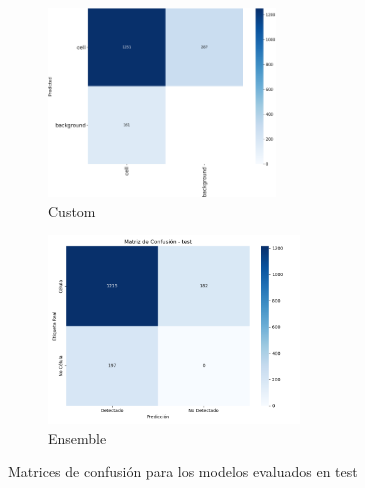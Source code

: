 \documentclass[12pt,a4paper,onecolumn,oneside]{report}
\begin{document}
\begin{figure}[H]
  \vspace{0.1cm}
  \begin{subfigure}[b]{0.45\textwidth}
    \centering
    \includegraphics[height=5cm]{figuras/resultados experimentacion/custom/test/confusion_matrix.png}
    \vspace{-0.3cm}
    \caption{\footnotesize Custom}
    \label{fig:confusion_custom_test}
  \end{subfigure}
  \hfill
  \begin{subfigure}[b]{0.45\textwidth}
    \centering
    \includegraphics[height=5cm]{figuras/resultados experimentacion/ensemble/confusion_matrices/confusion_matrix_test.png}
    \vspace{-0.3cm}
    \caption{\footnotesize Ensemble}
    \label{fig:confusion_ensemble_test}
  \end{subfigure}
  
  \vspace{-0.2cm}
  \caption{Matrices de confusión para los modelos evaluados en test}
  \label{fig:confusion_matrices_test}
\end{figure}
\end{document}
